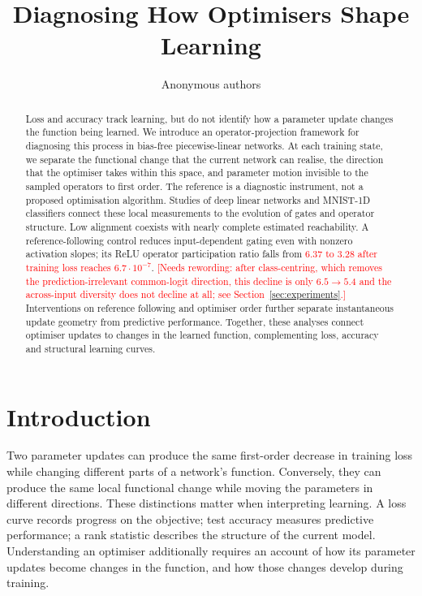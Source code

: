 \documentclass{article}
\title{Diagnosing How Optimisers Shape Learning}
\author{Anonymous authors}
\newcommand{\nat}[1]{\textcolor{red}{#1}}
\theoremstyle{definition}
\theoremstyle{remark}
\begin{document}
\maketitle

\begin{abstract}
Loss and accuracy track learning, but do not identify how a parameter update changes the function being learned. We introduce an operator-projection framework for diagnosing this process in bias-free piecewise-linear networks. At each training state, we separate the functional change that the current network can realise, the direction that the optimiser takes within this space, and parameter motion invisible to the sampled operators to first order. The reference is a diagnostic instrument, not a proposed optimisation algorithm. Studies of deep linear networks and MNIST-1D classifiers connect these local measurements to the evolution of gates and operator structure. Low alignment coexists with nearly complete estimated reachability. A reference-following control reduces input-dependent gating even with nonzero activation slopes; its ReLU operator participation ratio falls from \nat{$6.37$ to $3.28$ after training loss reaches $6.7\cdot10^{-7}$}. \nat{[Needs rewording: after class-centring, which removes the prediction-irrelevant common-logit direction, this decline is only $6.5\to5.4$ and the across-input diversity does not decline at all; see Section~\ref{sec:experiments}.]} Interventions on reference following and optimiser order further separate instantaneous update geometry from predictive performance. Together, these analyses connect optimiser updates to changes in the learned function, complementing loss, accuracy and structural learning curves.
\end{abstract}

\section{Introduction}
\label{sec:intro}

Two parameter updates can produce the same first-order decrease in training loss while changing different parts of a network's function. Conversely, they can produce the same local functional change while moving the parameters in different directions. These distinctions matter when interpreting learning. A loss curve records progress on the objective; test accuracy measures predictive performance; a rank statistic describes the structure of the current model. Understanding an optimiser additionally requires an account of how its parameter updates become changes in the function, and how those changes develop during training.
\end{document}

